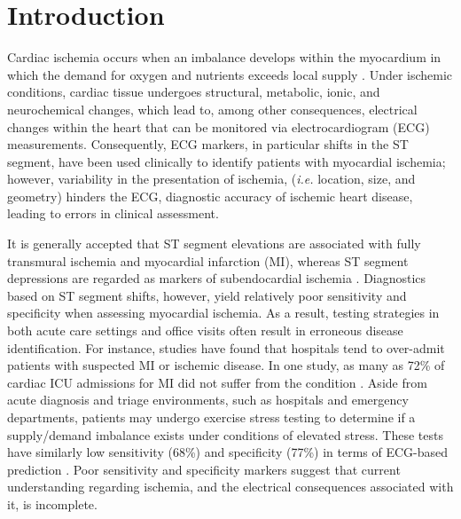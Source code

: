 %
\section{Introduction}
\label{sec:intro}

Cardiac ischemia occurs when an imbalance develops within the myocardium in which the demand for oxygen and nutrients exceeds local supply \cite{KKA:Hea94}. Under ischemic conditions, cardiac tissue undergoes structural, metabolic, ionic, and neurochemical changes, which lead to, among other consequences, electrical changes within the heart that can be monitored via electrocardiogram (ECG) measurements. Consequently, ECG markers, in particular shifts in the ST segment, have been used clinically to identify patients with myocardial ischemia; however, variability in the presentation of ischemia, (\emph{i.e.} location, size, and geometry) hinders the ECG, diagnostic accuracy of ischemic heart disease, leading to errors in clinical assessment.  

It is generally accepted that ST segment elevations are associated with fully transmural ischemia and myocardial infarction (MI), whereas ST segment depressions are regarded as markers of subendocardial ischemia \cite{BMB:Hol75}.  Diagnostics based on ST segment shifts, however, yield relatively poor sensitivity and specificity when assessing myocardial ischemia.  As a result, testing strategies in both acute care settings and office visits often result in erroneous disease identification.
For instance, studies have found that hospitals tend to over-admit patients with suspected MI or ischemic disease.  In one study, as many as 72\% of cardiac ICU admissions for MI did not suffer from the condition \cite{BMB:Lee87a}. Aside from acute diagnosis and triage environments, such as hospitals and emergency departments, patients may undergo exercise stress testing to determine if a supply/demand imbalance exists under conditions of elevated stress.  These tests have similarly low sensitivity (68\%) and specificity (77\%) in terms of ECG-based prediction \cite{KKA:Gia89}.  Poor sensitivity and specificity markers suggest that current understanding regarding ischemia, and the electrical consequences associated with it, is incomplete.  

